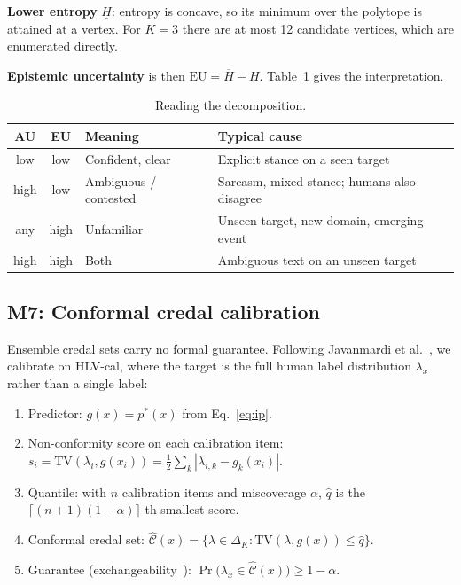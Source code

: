 \documentclass[11pt,a4paper]{article}
\newcommand{\lo}[1]{\underline{#1}}
\newcommand{\up}[1]{\overline{#1}}
\newcommand{\credal}{\mathcal{C}}
\newcommand{\simplex}{\Delta_K}
\newcommand{\TV}{\mathrm{TV}}
\newcommand{\EU}{\mathrm{EU}}
\begin{document}
\textbf{Lower entropy} $\lo{H}$: entropy is concave, so its minimum over the polytope is
attained at a vertex. For $K=3$ there are at most 12 candidate vertices, which are
enumerated directly.

\textbf{Epistemic uncertainty} is then $\EU = \up{H} - \lo{H}$. Table~\ref{tab:interp}
gives the interpretation.

\begin{table}[ht]
\centering
\small
\begin{tabular}{c c l l}
\toprule
AU & EU & Meaning & Typical cause \\
\midrule
low & low & Confident, clear & Explicit stance on a seen target \\
high & low & Ambiguous / contested & Sarcasm, mixed stance; humans also disagree \\
any & high & Unfamiliar & Unseen target, new domain, emerging event \\
high & high & Both & Ambiguous text on an unseen target \\
\bottomrule
\end{tabular}
\caption{Reading the decomposition.}
\label{tab:interp}
\end{table}

\subsection{M7: Conformal credal calibration}\label{sec:m7}

Ensemble credal sets carry no formal guarantee. Following Javanmardi et
al.~\cite{javanmardi2024}, we calibrate on HLV-cal, where the target is the full human
label distribution $\lambda_x$ rather than a single label:

\begin{enumerate}[leftmargin=*]
  \item Predictor: $g(x) = p^{*}(x)$ from Eq.~\eqref{eq:ip}.
  \item Non-conformity score on each calibration item:
  $s_i = \TV(\lambda_i, g(x_i)) = \tfrac12 \sum_k |\lambda_{i,k} - g_k(x_i)|$.
  \item Quantile: with $n$ calibration items and miscoverage $\alpha$,
  $\hat q$ is the $\lceil (n+1)(1-\alpha) \rceil$-th smallest score.
  \item Conformal credal set: $\hat{\credal}(x) = \{\lambda \in \simplex : \TV(\lambda, g(x))
  \le \hat q\}$.
  \item Guarantee (exchangeability~\cite{angelopoulos2023}):
  $\Pr\big(\lambda_x \in \hat{\credal}(x)\big) \ge 1-\alpha$.
\end{enumerate}
\end{document}
